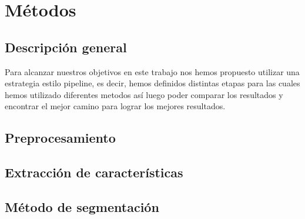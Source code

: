
\chapter{M\'etodos} %

\label{Chapter3} %


\section{Descripci\'on general}

Para alcanzar nuestros objetivos en este trabajo nos hemos propuesto utilizar una estrategia estilo pipeline, es decir, hemos definidos distintas etapas para las cuales hemos utilizado diferentes metodos así luego poder comparar los resultados y encontrar el mejor camino para lograr los mejores resultados. 

\section{Preprocesamiento}

\section{Extracci\'on de caracter\'isticas}

\section{M\'etodo de segmentaci\'on}